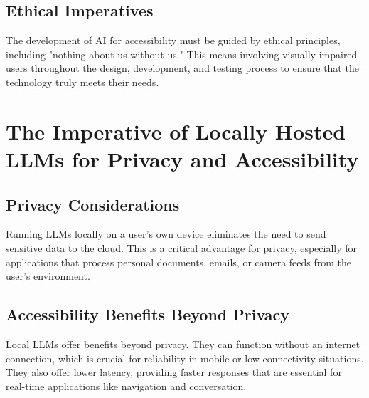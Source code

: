 \subsection{Ethical Imperatives}\label{ch9:ssec:ethical-imperatives}
The development of AI for accessibility must be guided by ethical principles, including "nothing about us without us." This means involving visually impaired users throughout the design, development, and testing process to ensure that the technology truly meets their needs.

\section{The Imperative of Locally Hosted LLMs for Privacy and Accessibility}\label{ch9:sec:local-llms}

\subsection{Privacy Considerations}\label{ch9:ssec:local-llm-privacy}
Running LLMs locally on a user's own device eliminates the need to send sensitive data to the cloud. This is a critical advantage for privacy, especially for applications that process personal documents, emails, or camera feeds from the user's environment.

\subsection{Accessibility Benefits Beyond Privacy}\label{ch9:ssec:local-llm-benefits}
Local LLMs offer benefits beyond privacy. They can function without an internet connection, which is crucial for reliability in mobile or low-connectivity situations. They also offer lower latency, providing faster responses that are essential for real-time applications like navigation and conversation.

